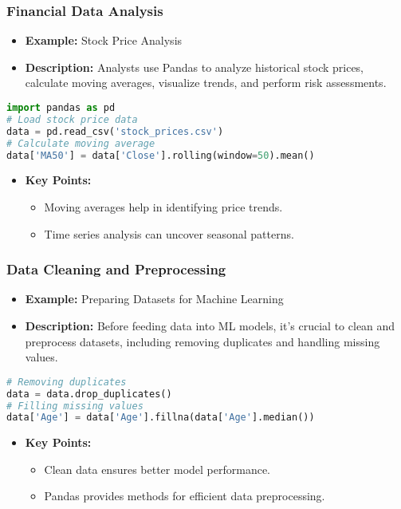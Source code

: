 \documentclass[aspectratio=169]{beamer}
\begin{document}
\begin{frame}[fragile]
    \frametitle{Financial Data Analysis}
    \begin{itemize}
        \item \textbf{Example:} Stock Price Analysis
        \item \textbf{Description:} Analysts use Pandas to analyze historical stock prices, calculate moving averages, visualize trends, and perform risk assessments.
    \end{itemize}
    
    \begin{lstlisting}[language=Python]
import pandas as pd
# Load stock price data
data = pd.read_csv('stock_prices.csv')
# Calculate moving average
data['MA50'] = data['Close'].rolling(window=50).mean()
    \end{lstlisting}
    
    \begin{itemize}
        \item \textbf{Key Points:}
        \begin{itemize}
            \item Moving averages help in identifying price trends.
            \item Time series analysis can uncover seasonal patterns.
        \end{itemize}
    \end{itemize}
\end{frame}

\begin{frame}[fragile]
    \frametitle{Data Cleaning and Preprocessing}
    \begin{itemize}
        \item \textbf{Example:} Preparing Datasets for Machine Learning
        \item \textbf{Description:} Before feeding data into ML models, it's crucial to clean and preprocess datasets, including removing duplicates and handling missing values.
    \end{itemize}
    
    \begin{lstlisting}[language=Python]
# Removing duplicates
data = data.drop_duplicates()
# Filling missing values
data['Age'] = data['Age'].fillna(data['Age'].median())
    \end{lstlisting}
    
    \begin{itemize}
        \item \textbf{Key Points:}
        \begin{itemize}
            \item Clean data ensures better model performance.
            \item Pandas provides methods for efficient data preprocessing.
        \end{itemize}
    \end{itemize}
\end{frame}
\end{document}
